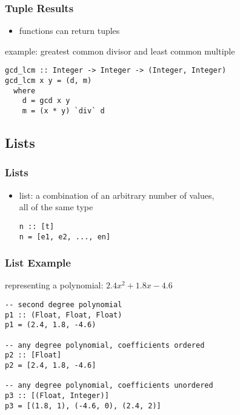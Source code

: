 \documentclass[dvipsnames]{beamer}
\theoremstyle{plain}
\begin{document}
\begin{frame}[fragile]
  \frametitle{Tuple Results}

  \begin{itemize}
    \item functions can return tuples
  \end{itemize}

  \begin{exampleblock}{example: greatest common divisor
                            and least common multiple}
    \begin{lstlisting}
gcd_lcm :: Integer -> Integer -> (Integer, Integer)
gcd_lcm x y = (d, m)
  where
    d = gcd x y
    m = (x * y) `div` d
    \end{lstlisting}
  \end{exampleblock}
\end{frame}

\subsection{Lists}

\begin{frame}[fragile]
  \frametitle{Lists}

  \begin{itemize}
    \item \alert{list}: a combination of an arbitrary number of values,\\
      all of the same type
    \smallskip
    \begin{lstlisting}
n :: [t]
n = [e1, e2, ..., en]
    \end{lstlisting}
  \end{itemize}
\end{frame}

\begin{frame}[fragile]
  \frametitle{List Example}

  \begin{exampleblock}{representing a polynomial: $2.4x^2 + 1.8x - 4.6$}
    \begin{lstlisting}
-- second degree polynomial
p1 :: (Float, Float, Float)
p1 = (2.4, 1.8, -4.6)

-- any degree polynomial, coefficients ordered
p2 :: [Float]
p2 = [2.4, 1.8, -4.6]

-- any degree polynomial, coefficients unordered
p3 :: [(Float, Integer)]
p3 = [(1.8, 1), (-4.6, 0), (2.4, 2)]
    \end{lstlisting}
  \end{exampleblock}
\end{frame}
\end{document}
